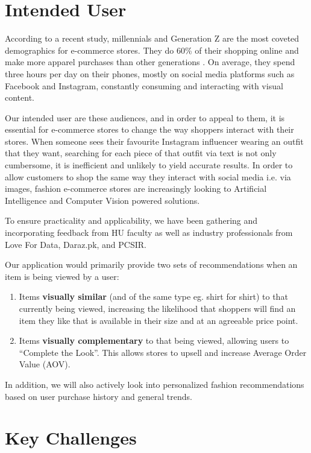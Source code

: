 \section{Intended User}

According to a recent study, millennials and Generation Z are the most coveted demographics for e-commerce stores. They do 60\% of their shopping online \cite{commerce360} and make more apparel purchases than other generations \cite{emarketer}. On average, they spend three hours per day on their phones, mostly on social media platforms such as Facebook and Instagram, constantly consuming and interacting with visual content.

Our intended user are these audiences, and in order to appeal to them, it is essential for e-commerce stores to change the way shoppers interact with their stores. When someone sees their favourite Instagram influencer wearing an outfit that they want, searching for each piece of that outfit via text is not only cumbersome, it is inefficient and unlikely to yield accurate results. In order to allow customers to shop the same way they interact with social media i.e. via images, fashion e-commerce stores are increasingly looking to Artificial Intelligence and Computer Vision powered solutions.

To ensure practicality and applicability, we have been gathering and incorporating feedback from HU faculty as well as industry professionals from Love For Data, Daraz.pk, and PCSIR.

Our application would primarily provide two sets of recommendations when an item is being viewed by a user:
\begin{enumerate}
	\item Items \textbf{visually similar} (and of the same type eg. shirt for shirt) to that currently being viewed, increasing the likelihood that shoppers will find an item they like that is available in their size and at an agreeable price point.
	\item Items \textbf{visually complementary} to that being viewed, allowing users to “Complete the Look”. This allows stores to upsell and increase Average Order Value (AOV).
\end{enumerate}

In addition, we will also actively look into personalized fashion recommendations based on user purchase history and general trends.

\section{Key Challenges}

